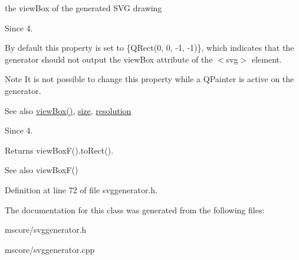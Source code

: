 the view\+Box of the generated S\+VG drawing 

\begin{DoxySince}{Since}
4.
\end{DoxySince}
By default this property is set to {\ttfamily }\{Q\+Rect(0, 0, -\/1, -\/1)\}, which indicates that the generator should not output the view\+Box attribute of the {\ttfamily } $<$svg$>$ element.

\begin{DoxyNote}{Note}
It is not possible to change this property while a Q\+Painter is active on the generator.
\end{DoxyNote}
\begin{DoxySeeAlso}{See also}
\hyperlink{class_svg_generator_a4a56c80b10833a8ded8715652d67afe2}{view\+Box()}, \hyperlink{class_svg_generator_acc6cf7b4596fb1c19ce95d45aac00124}{size}, \hyperlink{class_svg_generator_a3d8c9548b882f99b74b011e965b01a2e}{resolution}
\end{DoxySeeAlso}
\begin{DoxySince}{Since}
4.
\end{DoxySince}
Returns view\+Box\+F().to\+Rect().

\begin{DoxySeeAlso}{See also}
view\+Box\+F() 
\end{DoxySeeAlso}


Definition at line 72 of file svggenerator.\+h.



The documentation for this class was generated from the following files\+:\begin{DoxyCompactItemize}
\item 
mscore/svggenerator.\+h\item 
mscore/svggenerator.\+cpp\end{DoxyCompactItemize}
